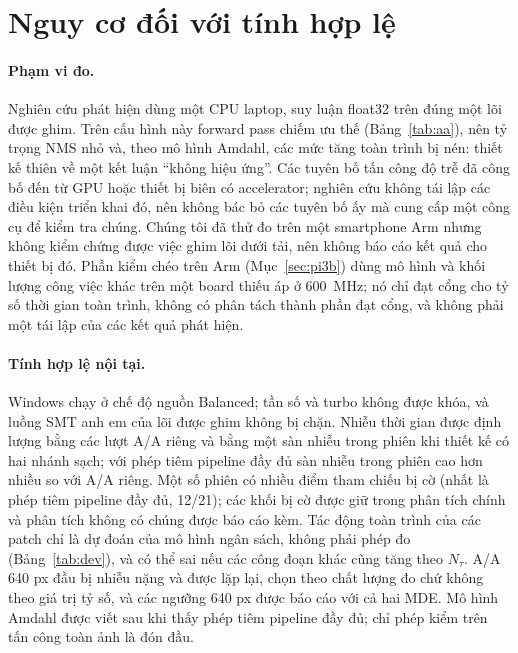 \documentclass[a4paper,fleqn]{cas-dc}
\newcommand{\Ntau}{N_{\tau}}
\begin{document}
\section{Nguy cơ đối với tính hợp lệ}
\label{sec:threats}
\paragraph{Phạm vi đo.}
Nghiên cứu phát hiện dùng một CPU laptop, suy luận float32 trên đúng một lõi được ghim. Trên cấu hình này forward pass chiếm ưu thế (Bảng~\ref{tab:aa}), nên tỷ trọng NMS nhỏ và, theo mô hình Amdahl, các mức tăng toàn trình bị nén: thiết kế thiên về một kết luận ``không hiệu ứng''. Các tuyên bố tấn công độ trễ đã công bố đến từ GPU hoặc thiết bị biên có accelerator; nghiên cứu không tái lập các điều kiện triển khai đó, nên không bác bỏ các tuyên bố ấy mà cung cấp một công cụ để kiểm tra chúng. Chúng tôi đã thử đo trên một smartphone Arm nhưng không kiểm chứng được việc ghim lõi dưới tải, nên không báo cáo kết quả cho thiết bị đó. Phần kiểm chéo trên Arm (Mục~\ref{sec:pi3b}) dùng mô hình và khối lượng công việc khác trên một board thiếu áp ở 600~MHz; nó chỉ đạt cổng cho tỷ số thời gian toàn trình, không có phân tách thành phần đạt cổng, và không phải một tái lập của các kết quả phát hiện.
\paragraph{Tính hợp lệ nội tại.}
Windows chạy ở chế độ nguồn Balanced; tần số và turbo không được khóa, và luồng SMT anh em của lõi được ghim không bị chặn. Nhiễu thời gian được định lượng bằng các lượt A/A riêng và bằng một sàn nhiễu trong phiên khi thiết kế có hai nhánh sạch; với phép tiêm pipeline đầy đủ sàn nhiễu trong phiên cao hơn nhiều so với A/A riêng. Một số phiên có nhiều điểm tham chiếu bị cờ (nhất là phép tiêm pipeline đầy đủ, 12/21); các khối bị cờ được giữ trong phân tích chính và phân tích không có chúng được báo cáo kèm. Tác động toàn trình của các patch chỉ là dự đoán của mô hình ngân sách, không phải phép đo (Bảng~\ref{tab:dev}), và có thể sai nếu các công đoạn khác cũng tăng theo $\Ntau$. A/A 640 px đầu bị nhiễu nặng và được lặp lại, chọn theo chất lượng đo chứ không theo giá trị tỷ số, và các ngưỡng 640 px được báo cáo với cả hai MDE. Mô hình Amdahl được viết sau khi thấy phép tiêm pipeline đầy đủ; chỉ phép kiểm trên tấn công toàn ảnh là đón đầu.
\end{document}
